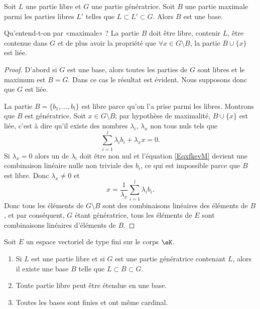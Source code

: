 \begin{lemma}   \label{LemkUfzHl}
    Soit \( L\) une partie libre et \( G\) une partie génératrice. Soit \( B\) une partie maximale parmi les parties libres \( L'\) telles que \( L\subset L'\subset G\). Alors \( B\) est une base.
\end{lemma}
Qu'entend-t-on par «maximale» ? La partie \( B\) doit être libre, contenir \( L\), être contenue dans \( G\) et de plus avoir la propriété que \( \forall x\in G\setminus B\), la partie \( B\cup\{ x \}\) est liée.

\begin{proof}
    D'abord si \( G\) est une base, alors toutes les parties de \( G\) sont libres et le maximum est \( B=G\). Dans ce cas le résultat est évident. Nous supposons donc que \( G\) est liée.

    La partie \( B=\{ b_1,\ldots, b_l \}\) est libre parce qu'on l'a prise parmi les libres. Montrons que \( B\) est génératrice. Soit \( x\in G\setminus B\); par hypothèse de maximalité, \( B\cup\{ x \}\) est liée, c'est à dire qu'il existe des nombres \( \lambda_i\), \( \lambda_x\) non tous nuls tels que
    \begin{equation}    \label{EqxfkevM}
        \sum_{i=1}^l\lambda_ib_i+\lambda_xx=0.
    \end{equation}
    Si \( \lambda_x=0\) alors un de \( \lambda_i\) doit être non nul et l'équation \eqref{EqxfkevM} devient une combinaison linéaire nulle non triviale des \( b_i\), ce qui est impossible parce que \( B\) est libre. Donc \( \lambda_x\neq 0\) et
    \begin{equation}
        x=\frac{1}{ \lambda_x }\sum_{i=1}^l\lambda_ib_i.
    \end{equation}
    Donc tous les éléments de \( G\setminus B\) sont des combinaisons linéaires des éléments de \( B\), et par conséquent, \( G\) étant génératrice, tous les éléments de \( E\) sont combinaisons linéaires d'éléments de \( B\). 
\end{proof}

\begin{theorem} \label{ThonmnWKs}
    Soit \( E\) un espace vectoriel de type fini sur le corps \( \eK\).
    \begin{enumerate}
        \item   \label{ItemBazxTZ}
            Si \( L\) est une partie libre et si \( G\) est une partie génératrice contenant \( L\), alors il existe une base \( B\) telle que \( L\subset B\subset G\).
        \item
            Toute partie libre peut être étendue en une base.
        \item
            Toutes les bases sont finies et ont même cardinal.
    \end{enumerate}
\end{theorem}

